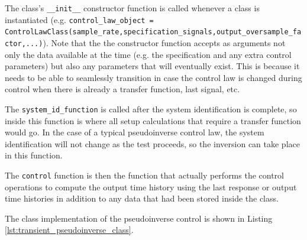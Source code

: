 \documentclass[pdf,12pt,report]{SANDreport}
\newcommand{\inlineCode}{\lstinline[basicstyle=\bfseries\ttfamily]}
\begin{document}
    The class's \inlineCode{__init__} constructor function is called whenever a class is instantiated (e.g. \inlineCode{control_law_object = ControlLawClass(sample_rate,specification_signals,output_oversample_factor,...)}). Note that the the constructor function accepts as arguments not only the data available at the time (e.g. the specification and any extra control parameters) but also any parameters that will eventually exist.  This is because it needs to be able to seamlessly transition in case the control law is changed during control when there is already a transfer function, last signal, etc.
    
    The \inlineCode{system_id_function} is called after the system identification is complete, so inside this function is where all setup calculations that require a transfer function would go.  In the case of a typical pseudoinverse control law, the system identification will not change as the test proceeds, so the inversion can take place in this function.
    
    The \inlineCode{control} function is then the function that actually performs the control operations to compute the output time history using the last response or output time histories in addition to any data that had been stored inside the class.
    
    The class implementation of the pseudoinverse control is shown in Listing \ref{lst:transient_pseudoinverse_class}.
    
\end{document}
